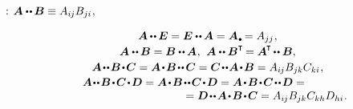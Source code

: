 :
${\bm{A} \dotdotp \hspace{-0.1ex} \bm{B} \equiv A_{i\hspace{-0.1ex}j} B_{ji}}$,

\nopagebreak\vspace{-0.1em}\begin{equation}
\begin{array}{c}
\bm{A} \hspace{-0.1ex} \dotdotp \hspace{-0.1ex} \bm{E} = \bm{E} \dotdotp \hspace{-0.1ex} \bm{A} = \bm{A}\hspace{.15ex}\tracedot = A_{jj} \hspace{.1ex} ,
\\[.2em]
%
\bm{A} \dotdotp \hspace{-0.1ex} \bm{B} = \bm{B} \dotdotp \hspace{-0.1ex} \bm{A} \hspace{.1ex}, \:\,
\bm{A} \dotdotp \bm{B}^{\T} \hspace{-0.2ex} = \bm{A}^{\hspace{-0.16ex}\T} \hspace{-0.2ex} \dotdotp \bm{B} ,
\\[.2em]
%
\bm{A} \narrowdotdotp \bm{B} \narrowdotp \bm{C} = \bm{A} \narrowdotp \bm{B} \narrowdotdotp \hspace{.1ex} \bm{C} = \bm{C} \narrowdotdotp \hspace{-0.1ex} \bm{A} \narrowdotp \bm{B} = A_{i\hspace{-0.1ex}j} B_{jk} C_{ki} \hspace{.1ex} ,
\\[.15em]
%
\bm{A} \hspace{-0.1ex}\narrowdotdotp \bm{B} \narrowdotp \bm{C} \narrowdotp \bm{D} = \bm{A} \narrowdotp \bm{B} \narrowdotdotp \bm{C} \narrowdotp \bm{D} = \bm{A} \narrowdotp \bm{B} \narrowdotp \bm{C} \narrowdotdotp \bm{D} = \hspace*{2.5em} \\
\hspace{10.5em} = \bm{D} \narrowdotdotp \bm{A} \narrowdotp \bm{B} \narrowdotp \bm{C} = A_{i\hspace{-0.1ex}j} B_{jk} C_{kh} D_{hi} \hspace{.1ex}.
\end{array}
\end{equation}

